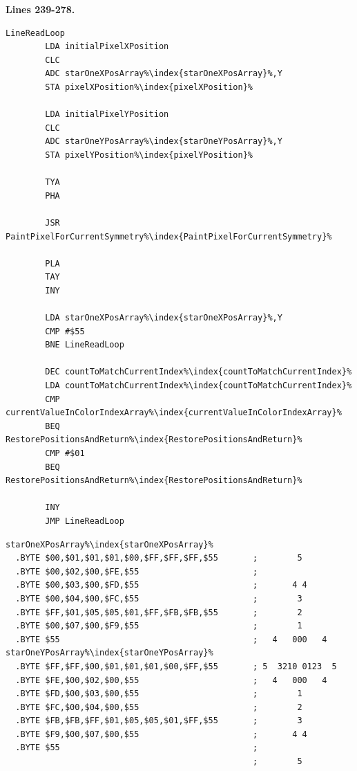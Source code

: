 \clearpage
\textbf{Lines 239-278. }
\begin{lstlisting}[caption=The core pattern-painting loop.,escapechar=\%]
LineReadLoop   
        LDA initialPixelXPosition
        CLC 
        ADC starOneXPosArray%\index{starOneXPosArray}%,Y
        STA pixelXPosition%\index{pixelXPosition}%

        LDA initialPixelYPosition
        CLC 
        ADC starOneYPosArray%\index{starOneYPosArray}%,Y
        STA pixelYPosition%\index{pixelYPosition}%

        TYA 
        PHA 

        JSR PaintPixelForCurrentSymmetry%\index{PaintPixelForCurrentSymmetry}%

        PLA 
        TAY 
        INY 

        LDA starOneXPosArray%\index{starOneXPosArray}%,Y
        CMP #$55
        BNE LineReadLoop

        DEC countToMatchCurrentIndex%\index{countToMatchCurrentIndex}%
        LDA countToMatchCurrentIndex%\index{countToMatchCurrentIndex}%
        CMP currentValueInColorIndexArray%\index{currentValueInColorIndexArray}%
        BEQ RestorePositionsAndReturn%\index{RestorePositionsAndReturn}%
        CMP #$01
        BEQ RestorePositionsAndReturn%\index{RestorePositionsAndReturn}%

        INY 
        JMP LineReadLoop

\end{lstlisting}
\begin{lstlisting}[basicstyle=\tiny\ttfamily,escapechar=\%]
starOneXPosArray%\index{starOneXPosArray}%
  .BYTE $00,$01,$01,$01,$00,$FF,$FF,$FF,$55       ;        5       
  .BYTE $00,$02,$00,$FE,$55                       ;                
  .BYTE $00,$03,$00,$FD,$55                       ;       4 4      
  .BYTE $00,$04,$00,$FC,$55                       ;        3       
  .BYTE $FF,$01,$05,$05,$01,$FF,$FB,$FB,$55       ;        2       
  .BYTE $00,$07,$00,$F9,$55                       ;        1       
  .BYTE $55                                       ;   4   000   4  
starOneYPosArray%\index{starOneYPosArray}%
  .BYTE $FF,$FF,$00,$01,$01,$01,$00,$FF,$55       ; 5  3210 0123  5
  .BYTE $FE,$00,$02,$00,$55                       ;   4   000   4  
  .BYTE $FD,$00,$03,$00,$55                       ;        1       
  .BYTE $FC,$00,$04,$00,$55                       ;        2       
  .BYTE $FB,$FB,$FF,$01,$05,$05,$01,$FF,$55       ;        3       
  .BYTE $F9,$00,$07,$00,$55                       ;       4 4      
  .BYTE $55                                       ;                
                                                  ;        5       
\end{lstlisting}
\clearpage

